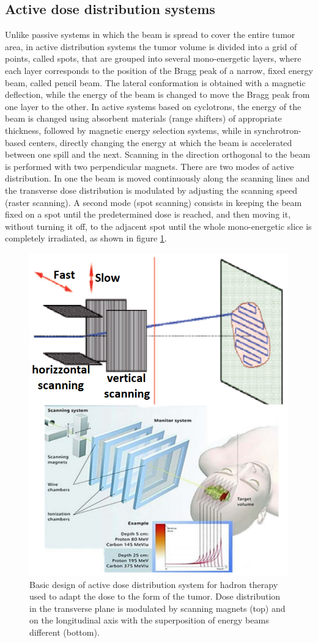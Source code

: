 \subsection{Active dose distribution systems}
\noindent Unlike passive systems in which the beam is spread to cover the entire tumor area, in active distribution systems the tumor volume is divided into a grid of points, called spots, that are grouped into several mono-energetic layers, where each layer corresponds to the position of the Bragg peak of a narrow, fixed energy beam, called pencil beam.
The lateral conformation is obtained with a magnetic deflection, while the energy of the beam is changed to move the Bragg peak from one layer to the other.
In active systems based on cyclotrons, the energy of the beam is changed using absorbent materials (range shifters) of appropriate thickness, followed by magnetic energy selection systems, while in synchrotron-based centers, directly changing the energy at which the beam is accelerated between one spill and the next.
Scanning in the direction orthogonal to the beam is performed with two perpendicular magnets.
\newline
There are two modes of active distribution. In one the beam is moved continuously along the scanning lines and the transverse dose distribution is modulated by adjusting the scanning speed (raster scanning). A second mode (spot scanning)\cite{cnao} consists in keeping the beam fixed on a spot until the predetermined dose is reached, and then moving it, without turning it off, to the adjacent spot until the whole mono-energetic slice is completely irradiated, as shown in figure \ref{fig:active}.
\begin{figure}[H]
	\centering
	\includegraphics[width=0.7\linewidth]{IMG/ch1/Active2}
	\caption{Basic design of active dose distribution system for hadron therapy used to adapt the dose to the form of the tumor. Dose distribution in the transverse plane is modulated by scanning magnets (top) and on the longitudinal axis with the superposition of energy beams different (bottom).}
	\label{fig:active}
\end{figure}
